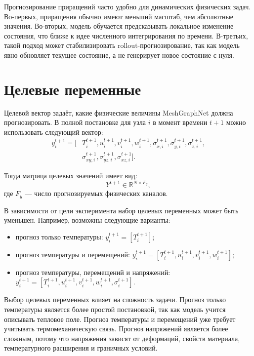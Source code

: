 Прогнозирование приращений часто удобно для динамических физических задач. Во-первых, приращения обычно имеют меньший масштаб, чем абсолютные значения. Во-вторых, модель обучается предсказывать локальное изменение состояния, что ближе к идее численного интегрирования по времени. В-третьих, такой подход может стабилизировать rollout-прогнозирование, так как модель явно обновляет текущее состояние, а не генерирует новое состояние с нуля.

\section{Целевые переменные}

Целевой вектор задаёт, какие физические величины MeshGraphNet должна прогнозировать. В полной постановке для узла $i$ в момент времени $t+1$ можно использовать следующий вектор:
\begin{equation}
\begin{split}
    y_i^{t+1}=[&T_i^{t+1},
    u_i^{t+1},v_i^{t+1},w_i^{t+1},
    \sigma_{x,i}^{t+1},\sigma_{y,i}^{t+1},\sigma_{z,i}^{t+1},\\
    &\sigma_{xy,i}^{t+1},\sigma_{yz,i}^{t+1},\sigma_{xz,i}^{t+1}].
\end{split}
\end{equation}

Тогда матрица целевых значений имеет вид:
\begin{equation}
    Y^{t+1}\in\mathbb{R}^{N\times F_y},
\end{equation}
где $F_y$ --- число прогнозируемых физических каналов.

В зависимости от цели эксперимента набор целевых переменных может быть уменьшен. Например, возможны следующие варианты:
\begin{itemize}
    \item прогноз только температуры: $y_i^{t+1}=[T_i^{t+1}]$;
    \item прогноз температуры и перемещений: $y_i^{t+1}=[T_i^{t+1},u_i^{t+1},v_i^{t+1},w_i^{t+1}]$;
    \item прогноз температуры, перемещений и напряжений: $y_i^{t+1}=[T_i^{t+1},u_i^{t+1},v_i^{t+1},w_i^{t+1},\sigma_i^{t+1}]$.
\end{itemize}

Выбор целевых переменных влияет на сложность задачи. Прогноз только температуры является более простой постановкой, так как модель учится описывать тепловое поле. Прогноз температуры и перемещений уже требует учитывать термомеханическую связь. Прогноз напряжений является более сложным, потому что напряжения зависят от деформаций, свойств материала, температурного расширения и граничных условий.

